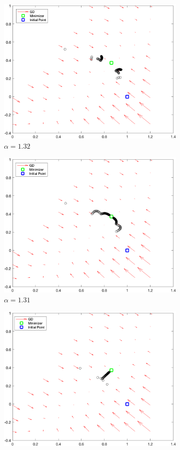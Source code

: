 \documentclass{article}
\begin{document}
 

\begin{figure}[htp]
	
	\begin{subfigure}{.5\textwidth}
		\centering
		\includegraphics[width=.8\linewidth]{figs/Q2_132.png}
		\caption{$ \alpha = 1.32 $}
	\end{subfigure}
	\begin{subfigure}{.5\textwidth}
		\centering
		\includegraphics[width=.8\linewidth]{figs/Q2_131.png}
		\caption{$ \alpha = 1.31 $}
	\end{subfigure}
	\begin{subfigure}{.5\textwidth}
		\centering
		\includegraphics[width=.8\linewidth]{figs/Q2_100.png}

\end{subfigure}
\end{figure}
\end{document}
